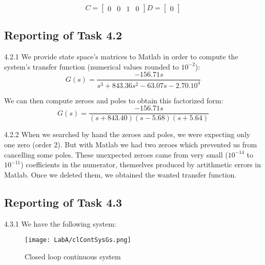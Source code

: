 \documentclass[11pt]{article}
\begin{document}
\begin{equation*}
C=
\begin{bmatrix}
0 & 0 & 1 & 0
\end{bmatrix}
D=
\begin{bmatrix}
0
\end{bmatrix}
\end{equation*}


\subsection*{Reporting of Task 4.2}

4.2.1 We provide state space's matrices to Matlab in order to compute the system's transfer function (numerical values rounded to $10^{-2}$):
\begin{equation*}
G(s)=\frac{-156.71s}{s^3  +  843.36s^2 - 63.07s -2.70.10^4}
\end{equation*}

We can then compute zeroes and poles to obtain this factorized form:
\begin{equation*}
G(s)=\frac{-156.71s}{(s+843.40)(s-5.68)(s+5.64)}
\end{equation*}

4.2.2 When we searched by hand the zeroes and poles, we were expecting only one zero (order 2). But with Matlab we had two zeroes which prevented us from cancelling some poles. These unexpected zeroes came from very small ($10^{-14}$ to $10^{-11}$) coefficients in the numerator, themselves produced by artithmetic errors in Matlab. Once we deleted them, we obtained the wanted transfer function.

\subsection*{Reporting of Task 4.3}

4.3.1 We have the following system:
\begin{figure}[H]
  \texttt{[image: LabA/clContSysGs.png]}
  \caption{Closed loop continuous system}
  \label{fig:fig1}
\end{figure}
\end{document}
